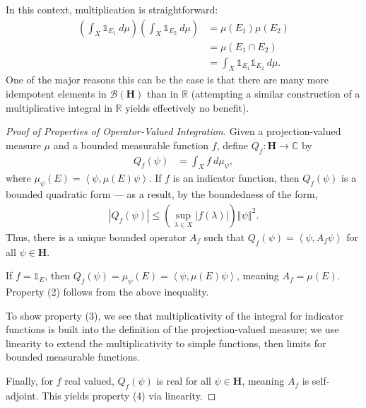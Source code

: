 \documentclass[10pt]{extarticle}
\newcommand{\R}{\mathbb{R}}
\newcommand{\C}{\mathbb{C}}
\newcommand{\iprod}[2]{\left\langle #1,#2\right\rangle}
\newcommand{\norm}[1]{\left\Vert #1\right\Vert}
\theoremstyle{plain}
\theoremstyle{definition}
\theoremstyle{remark}
\renewcommand{\newline}{\hfill\break}
\begin{document}
  In this context, multiplication is straightforward:
  \begin{align*}
    \left(\int_{X}^{} \mathbb{1}_{E_1}\:d\mu\right)\left(\int_{X}^{} \mathbb{1}_{E_2}\:d\mu\right) &= \mu(E_1)\mu(E_2)\\
                                                                                                   &= \mu(E_1 \cap E_2)\\
                                                                                                   &= \int_{X}^{} \mathbb{1}_{E_1}\mathbb{1}_{E_2}\:d\mu.
  \end{align*}
  One of the major reasons this can be the case is that there are many more idempotent elements in $\mathcal{B}(\mathbf{H})$ than in $\R$ (attempting a similar construction of a multiplicative integral in $\R$ yields effectively no benefit).
  \begin{proof}[Proof of Properties of Operator-Valued Integration]
    Given a projection-valued measure $\mu$ and a bounded measurable function $f$, define $Q_{f}: \mathbf{H}\rightarrow \C$ by
    \begin{align*}
      Q_f(\psi) &= \int_{X}^{}f \:d\mu_{\psi},
    \end{align*}
    where $\mu_{\psi}(E) = \iprod{\psi}{\mu(E)\psi}$. If $f$ is an indicator function, then $Q_f(\psi)$ is a bounded quadratic form --- as a result, by the boundedness of the form,
    \begin{align*}
      |Q_f(\psi)| \leq \left(\sup_{\lambda \in X}|f(\lambda)|\right)\norm{\psi}^2.
    \end{align*}
    Thus, there is a unique bounded operator $A_f$ such that $Q_f(\psi) = \iprod{\psi}{A_f\psi}$ for all $\psi \in \mathbf{H}$.\newline

    If $f = \mathbb{1}_E$, then $Q_f(\psi) = \mu_{\psi}(E) = \iprod{\psi}{\mu(E)\psi}$, meaning $A_f = \mu(E)$. Property (2) follows from the above inequality.\newline

    To show property (3), we see that multiplicativity of the integral for indicator functions is built into the definition of the projection-valued measure; we use linearity to extend the multiplicativity to simple functions, then limits for bounded measurable functions.\newline

    Finally, for $f$ real valued, $Q_f(\psi)$ is real for all $\psi \in \mathbf{H}$, meaning $A_f$ is self-adjoint. This yields property (4) via linearity.
  \end{proof}
\end{document}
